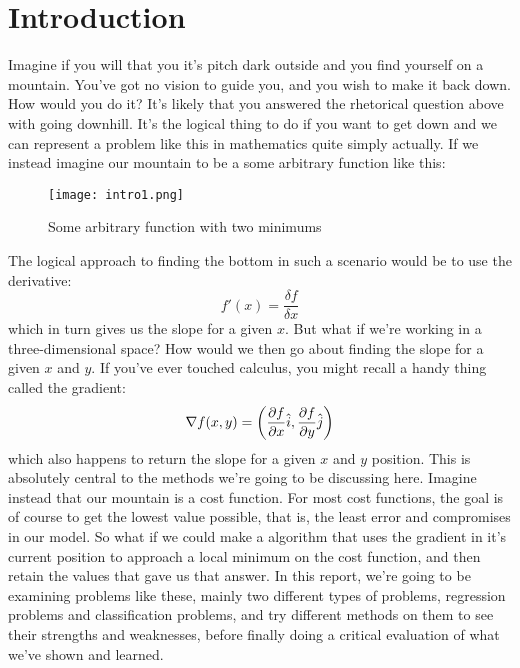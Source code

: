 \documentclass{article}
\begin{document}
\section{Introduction}
Imagine if you will that you it's pitch dark outside and you find yourself on a mountain. You've got no vision to guide you, and you wish to make it back down. How would you do it?\newline
It's likely that you answered the rhetorical question above with going downhill. It's the logical thing to do if you want to get down and we can represent a problem like this in mathematics quite simply actually. If we instead imagine our mountain to be a some arbitrary function like this:
\begin{figure}[ht!]
    \centering
    \texttt{[image: intro1.png]}
    \caption{Some arbitrary function with two minimums}
    \label{fig1}
\end{figure}
\newline
The logical approach to finding the bottom in such a scenario would be to use the derivative:
\begin{equation*}
    f'(x) = \frac{\delta f}{\delta x}
\end{equation*}
\newline
which in turn gives us the slope for a given $x$.
\newline
But what if we're working in a three-dimensional space? How would we then go about finding the slope for a given $x$ and $y$.
\newline If you've ever touched calculus, you might recall a handy thing called the gradient:
\begin{equation*}
    \nabla f(x,y) = \left(\pdv{f}{x}\hat{i},\pdv{f}{y}\hat{j}\right)
\end{equation*}
which also happens to return the slope for a given $x$ and $y$ position.
\newline
This is absolutely central to the methods we're going to be discussing here. \newline
Imagine instead that our mountain is a cost function. For most cost functions, the goal is of course to get the lowest value possible, that is, the least error and compromises in our model. So what if we could make a algorithm that uses the gradient in it's current position to approach a local minimum on the cost function, and then retain the values that gave us that answer. \newline
In this report, we're going to be examining problems like these, mainly two different types of problems, regression problems and classification problems, and try different methods on them to see their strengths and weaknesses, before finally doing a critical evaluation of what we've shown and learned. \newpage
\end{document}
